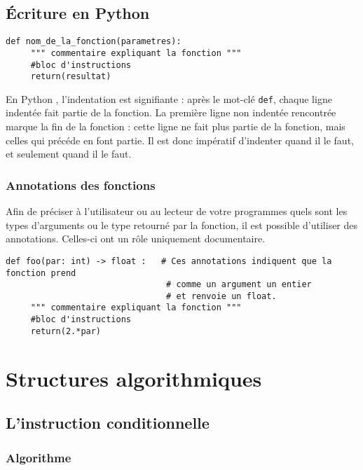 \subsection{\'Ecriture en Python }

\begin{lstlisting}
def nom_de_la_fonction(parametres):
     """ commentaire expliquant la fonction """
     #bloc d'instructions
     return(resultat)
\end{lstlisting}

\begin{remarque}
En Python , l'indentation est {signifiante} : après le mot-clé \texttt{def}, chaque 
ligne indentée fait partie de la fonction. La première ligne non indentée rencontrée marque la 
fin de la fonction : cette ligne ne fait plus partie de la fonction, mais celles qui précéde en 
font partie. Il est donc {impératif} d'indenter quand il le faut, et seulement 
quand il le faut.%
\end{remarque}

\subsubsection*{Annotations des fonctions}

Afin de préciser à l'utilisateur ou au lecteur de votre programmes quels sont les types d'arguments ou le type retourné par la fonction, il est possible d'utiliser des annotations. Celles-ci ont un rôle uniquement documentaire.
\begin{lstlisting}
def foo(par: int) -> float :   # Ces annotations indiquent que la fonction prend 
                                # comme un argument un entier 
                                # et renvoie un float.
     """ commentaire expliquant la fonction """
     #bloc d'instructions
     return(2.*par)
\end{lstlisting}

\section{Structures algorithmiques}
\subsection{L'instruction conditionnelle}

\subsubsection{Algorithme}

